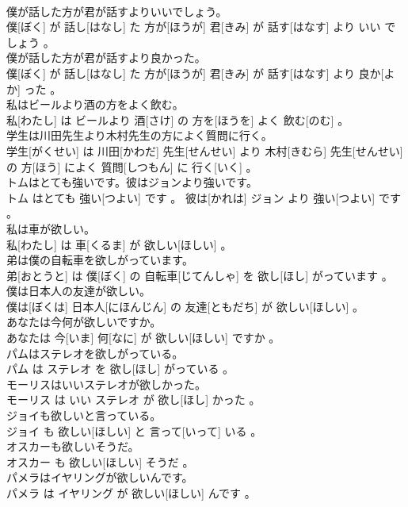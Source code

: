 \documentclass[8pt]{extreport}
\begin{document}
\begin{CJK}{UTF8}{min}
\\	僕が話した方が君が話すよりいいでしょう。	
\\	僕[ぼく] が 話し[はなし] た 方が[ほうが] 君[きみ] が 話す[はなす] より いい でしょう 。
\\	僕が話した方が君が話すより良かった。	
\\	僕[ぼく] が 話し[はなし] た 方が[ほうが] 君[きみ] が 話す[はなす] より 良か[よか] った 。
\\	私はビールより酒の方をよく飲む。	
\\	私[わたし] は ビールより 酒[さけ] の 方を[ほうを] よく 飲む[のむ] 。
\\	学生は川田先生より木村先生の方によく質問に行く。	
\\	学生[がくせい] は 川田[かわだ] 先生[せんせい] より 木村[きむら] 先生[せんせい] の 方[ほう] によく 質問[しつもん] に 行く[いく] 。
\\	トムはとても強いです。彼はジョンより強いです。	
\\	トム はとても 強い[つよい] です 。 彼は[かれは] ジョン より 強い[つよい] です 。
\\	私は車が欲しい。	
\\	私[わたし] は 車[くるま] が 欲しい[ほしい] 。
\\	弟は僕の自転車を欲しがっています。	
\\	弟[おとうと] は 僕[ぼく] の 自転車[じてんしゃ] を 欲し[ほし] がっています 。
\\	僕は日本人の友達が欲しい。	
\\	僕は[ぼくは] 日本人[にほんじん] の 友達[ともだち] が 欲しい[ほしい] 。
\\	あなたは今何が欲しいですか。	
\\	あなたは 今[いま] 何[なに] が 欲しい[ほしい] ですか 。
\\	パムはステレオを欲しがっている。	
\\	パム は ステレオ を 欲し[ほし] がっている 。
\\	モーリスはいいステレオが欲しかった。	
\\	モーリス は いい ステレオ が 欲し[ほし] かった 。
\\	ジョイも欲しいと言っている。	
\\	ジョイ も 欲しい[ほしい] と 言って[いって] いる 。
\\	オスカーも欲しいそうだ。	
\\	オスカー も 欲しい[ほしい] そうだ 。
\\	パメラはイヤリングが欲しいんです。	
\\	パメラ は イヤリング が 欲しい[ほしい] んです 。

\end{CJK}
\end{document}
